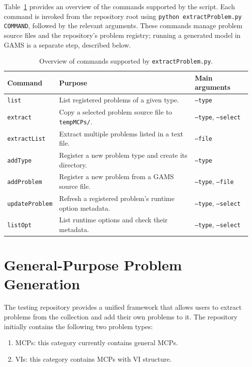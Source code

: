 Table~\ref{table:testing_repo_commands} provides an overview of the commands supported by the script. Each command is invoked from the repository root using \texttt{python extractProblem.py COMMAND}, followed by the relevant arguments. These commands manage problem source files and the repository's problem registry; running a generated model in GAMS is a separate step, described below.

\begin{table}[htbp]
    \centering
    \small
    \caption{Overview of commands supported by \texttt{extractProblem.py}.}
    \label{table:testing_repo_commands}
    \begin{tabular}{@{}p{}p{}p{}@{}}
        \hline
        \textbf{Command} & \textbf{Purpose} & \textbf{Main arguments} \\
        \hline
        \texttt{list} & List registered problems of a given type. & \texttt{--type} \\
        \texttt{extract} & Copy a selected problem source file to \texttt{tempMCPs/}. & \texttt{--type}, \texttt{--select} \\
        \texttt{extractList} & Extract multiple problems listed in a text file. & \texttt{--file} \\
        \texttt{addType} & Register a new problem type and create its directory. & \texttt{--type} \\
        \texttt{addProblem} & Register a new problem from a GAMS source file. & \texttt{--type}, \texttt{--file} \\
        \texttt{updateProblem} & Refresh a registered problem's runtime option metadata. & \texttt{--type}, \texttt{--select} \\
        \texttt{listOpt} & List runtime options and check their metadata. & \texttt{--type}, \texttt{--select} \\
        \hline
    \end{tabular}
\end{table}

\section{General-Purpose Problem Generation}

The testing repository provides a unified framework that allows users to extract problems from the collection and add their own problems to it. The repository initially contains the following two problem types:
\begin{enumerate}
    \item MCPs: this category currently contains general MCPs.
    \item VIs: this category contains MCPs with VI structure.
\end{enumerate}

